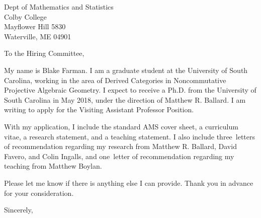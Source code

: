\documentclass[12pt]{letter}
\date{\today}
\def\MSPRF{As requested in the posting, I have applied for an NSF Mathematical Sciences Postdoctoral Fellowship.
  If awarded, I plan to use it to carry out the proposed research laid out in my research statement at the University of Glasgow under the direction of Michael Wemyss.}
\def\position{Visiting Assistant Professor Position}
\def\materials{the standard AMS cover sheet,
  a curriculum vitae,
  a research statement,
  and a teaching statement}
\def\contacts{Ettore Aldrovandi}
\def\numresrefs{three}
\def\numteachrefs{one}
\def\refs{Matthew R. Ballard, David Favero, and Colin Ingalls}
\def\teachingrefs{Matthew Boylan}
\begin{document}
\begin{letter}{
    Dept of Mathematics and Statistics\\
    Colby College\\
    Mayflower Hill 5830\\
    Waterville, ME 04901
  }
  \opening{To the Hiring Committee,}
  
  My name is Blake Farman.
  I am a graduate student at the University of South Carolina, working in the area of Derived Categories in Noncommutative Projective Algebraic Geometry.
  I expect to receive a Ph.D. from the University of South Carolina in May 2018, under the direction of Matthew R. Ballard.
  I am writing to apply for the \position.



  With my application, I include \materials.
  I also include \numresrefs\  letters of recommendation regarding my research from \refs, and \numteachrefs\ letter of recommendation regarding my teaching from \teachingrefs.

  
  Please let me know if there is anything else I can provide.
  Thank you in advance for your consideration.
  \closing{Sincerely,}
\end{letter}
\end{document}
